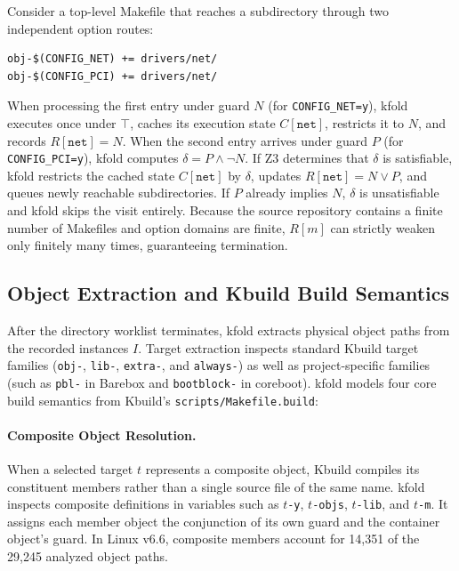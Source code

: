 \documentclass[acmsmall]{acmart}
\newcommand{\tool}{\textsf{kfold}\xspace}
\begin{document}
Consider a top-level Makefile that reaches a subdirectory through two independent option routes:
\begin{lstlisting}[style=kbuild-example]
obj-$(CONFIG_NET) += drivers/net/
obj-$(CONFIG_PCI) += drivers/net/
\end{lstlisting}
When processing the first entry under guard $N$ (for \texttt{CONFIG\_NET=y}), \tool executes  once under $\top$, caches its execution state $C[\texttt{net}]$, restricts it to $N$, and records $R[\texttt{net}] = N$.
When the second entry arrives under guard $P$ (for \texttt{CONFIG\_PCI=y}), \tool computes $\delta = P \land \neg N$.
If Z3 determines that $\delta$ is satisfiable, \tool restricts the cached state $C[\texttt{net}]$ by $\delta$, updates $R[\texttt{net}] = N \lor P$, and queues newly reachable subdirectories.
If $P$ already implies $N$, $\delta$ is unsatisfiable and \tool skips the visit entirely.
Because the source repository contains a finite number of Makefiles and option domains are finite, $R[m]$ can strictly weaken only finitely many times, guaranteeing termination.

\subsection{Object Extraction and Kbuild Build Semantics}\label{sec:technique:build}

After the directory worklist terminates, \tool extracts physical object paths from the recorded instances $I$.
Target extraction inspects standard Kbuild target families (\texttt{obj-}, \texttt{lib-}, \texttt{extra-}, and \texttt{always-}) as well as project-specific families (such as \texttt{pbl-} in Barebox and \texttt{bootblock-} in coreboot).
\tool models four core build semantics from Kbuild's \texttt{scripts/Makefile.build}:

\paragraph{Composite Object Resolution.}
When a selected target $t$ represents a composite object, Kbuild compiles its constituent members rather than a single source file of the same name.
\tool inspects composite definitions in variables such as \texttt{$t$-y}, \texttt{$t$-objs}, \texttt{$t$-lib}, and \texttt{$t$-m}.
It assigns each member object the conjunction of its own guard and the container object's guard.
In Linux v6.6, composite members account for 14,351 of the 29,245 analyzed object paths.
\end{document}
